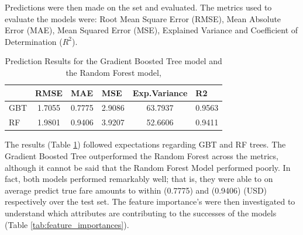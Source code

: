 \documentclass[11pt]{article}
\begin{document}
Predictions were then made on the set and evaluated. The metrics used to evaluate the models were: Root Mean Square Error (RMSE), Mean Absolute Error (MAE), Mean Squared Error (MSE), Explained Variance and Coefficient of Determination ($R^2$).

\begin{table}[H]
\centering
\begin{tabular}{l|c|c|c|c|c|}
\cline{2-6}
                          & \multicolumn{1}{l|}{RMSE} & \multicolumn{1}{l|}{MAE} & \multicolumn{1}{l|}{MSE} & \multicolumn{1}{l|}{Exp.Variance} & \multicolumn{1}{l|}{R2} \\ \hline
\multicolumn{1}{|l|}{GBT} & 1.7055                    & 0.7775                   & 2.9086                   & 63.7937                           & 0.9563                  \\ \hline
\multicolumn{1}{|l|}{RF}  & 1.9801                    & 0.9406                   & 3.9207                   & 52.6606                           & 0.9411                  \\ \hline
\end{tabular}
\caption{Prediction Results for the Gradient Boosted Tree model and the Random Forest model,}
\label{tab:pred_results}
\end{table}

The results (Table \ref{tab:pred_results}) followed expectations regarding GBT and RF trees. The Gradient Boosted Tree outperformed the Random Forest across the metrics, although it cannot be said that the Random Forest Model performed poorly. In fact, both models performed remarkably well; that is, they were able to on average predict true fare amounts to within (0.7775) and (0.9406) (USD) respectively over the test set. The feature importance's were then investigated to understand which attributes are contributing to the successes of the models (Table \ref{tab:feature_importances}).
\end{document}
